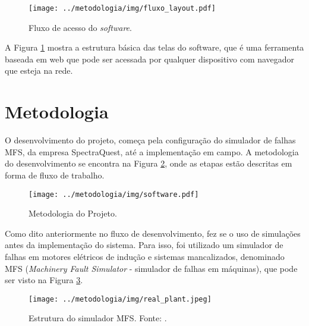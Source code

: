 \documentclass[a4paper]{ifacconf}
\begin{document}
\begin{figure}[H]
  \begin{center}
      \texttt{[image: ../metodologia/img/fluxo\_layout.pdf]}
  \end{center}
  \caption{Fluxo de acesso do \textit{software}.} 
  \label{fig:fluxo_software}
\end{figure}

A Figura \ref{fig:fluxo_software} mostra a estrutura básica das telas do software, que é uma ferramenta 
baseada em web que pode ser acessada por qualquer dispositivo com navegador que esteja na rede.

\section{Metodologia}

O desenvolvimento do projeto, começa pela configuração do simulador de falhas MFS\textsuperscript\textregistered,
da empresa SpectraQuest\textsuperscript\textregistered, até a implementação em campo. A metodologia do desenvolvimento se encontra na
Figura \ref{fig:metodologia}, onde as etapas estão descritas em forma de fluxo de trabalho.

\begin{figure}[H]
  \begin{center}
      \texttt{[image: ../metodologia/img/software.pdf]}
      \caption{Metodologia do Projeto.}
  \end{center} 
  \label{fig:metodologia}
\end{figure}

Como dito anteriormente no fluxo de desenvolvimento, fez se o uso de simulações antes da implementação do sistema.
Para isso, foi utilizado um simulador de falhas em motores elétricos de indução e sistemas mancalizados, denominado
MFS \textsuperscript \textregistered (\textit{Machinery Fault Simulator} - simulador de falhas em máquinas), que pode ser visto na Figura 
\ref{fig:real_plant}.

\begin{figure}[H]
    \begin{center}
        \texttt{[image: ../metodologia/img/real\_plant.jpeg]}
    \end{center}
    \caption{Estrutura do simulador MFS\textsuperscript\textregistered. Fonte: \cite{SpectraQuest2011}.}
    \label{fig:real_plant}
\end{figure}
\end{document}

